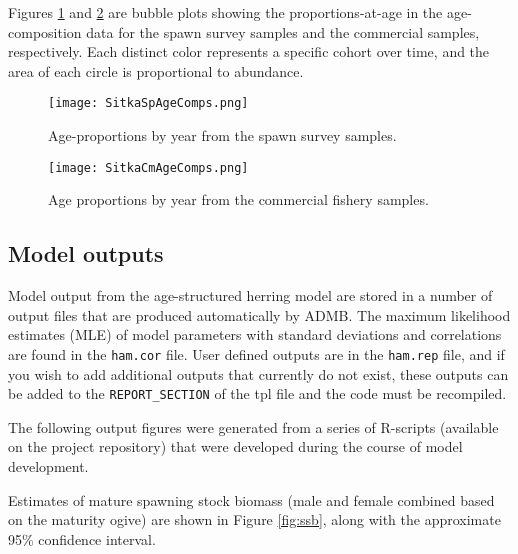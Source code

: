 \documentclass[12pt,letterpaper]{article}
\begin{document}
  Figures \ref{fig:SitkaSpAgeComps} and \ref{fig:SitkaCmAgeComps} are bubble plots showing the proportions-at-age in the age-composition data for the spawn survey samples and the commercial samples, respectively. Each distinct color represents a specific cohort over time, and the area of each circle is proportional to abundance.

  \begin{figure}[tb]
    \centering
    \texttt{[image: SitkaSpAgeComps.png]}
    \caption{Age-proportions by year from the spawn survey samples.}
    \label{fig:SitkaSpAgeComps}
  \end{figure}  

  \begin{figure}[tb]
    \centering
    \texttt{[image: SitkaCmAgeComps.png]}
    \caption{Age proportions by year from the commercial fishery samples.}
    \label{fig:SitkaCmAgeComps}
  \end{figure}

  \clearpage














  \subsection{Model outputs} %
  \label{sub:model_outputs}

  Model output from the age-structured herring model are stored in a number of output files that are produced automatically by ADMB. The maximum likelihood estimates (MLE) of model parameters with standard deviations and correlations are found in the \texttt{ham.cor} file. User defined outputs are in the \texttt{ham.rep} file, and if you wish to add additional outputs that currently do not exist, these outputs can be added to the \texttt{REPORT\_SECTION} of the tpl file and the code must be recompiled.  

  The following output figures were generated from a series of R-scripts (available on the project repository) that were developed during the course of model development.

  Estimates of mature spawning stock biomass (male and female combined based on the maturity ogive) are shown in Figure \ref{fig:ssb}, along with the approximate 95\% confidence interval.
\end{document}
